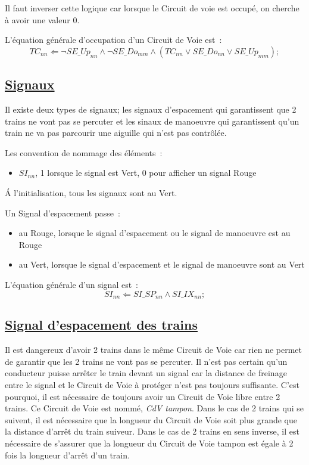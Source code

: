 Il faut inverser cette logique car lorsque le Circuit de voie est
occupé, on cherche à avoir une valeur 0.

\medskip
L'équation générale d'occupation d'un Circuit de Voie est~:
$$\boxed{
  TC_{nn} \Leftarrow \neg SE\_Up_{nn} \land \neg SE\_Do_{mm} \land
  (TC_{nn} \lor SE\_Do_{nn} \lor SE\_Up_{mm});
}$$


\subsection{\underline{Signaux}}
\label{sec:esp}

Il existe deux types de signaux; les signaux d'espacement qui
garantissent que 2 trains ne vont pas se percuter et les sinaux de
manoeuvre qui garantissent qu'un train ne va pas parcourir une
aiguille qui n'est pas contrôlée.

Les convention de nommage des éléments~:
\begin{itemize}
\item $SI_{nn}$, 1 lorsque le signal est Vert, 0 pour afficher un signal
  Rouge
\end{itemize}

\'A l'initialisation, tous les signaux sont au Vert.

Un Signal d'espacement passe~:
\begin{itemize}
\item au Rouge, lorsque le signal d'espacement ou le signal de
  manoeuvre est au Rouge
\item au Vert, lorsque le signal d'espacement et le signal de
  manoeuvre sont au Vert
\end{itemize}


\medskip
L'équation générale d'un signal est~:
$$\boxed{
  SI_{nn} \Leftarrow SI\_SP_{nn} \land SI\_IX_{nn};
}$$


\subsection{\underline{Signal d'espacement des trains}}
\label{sec:esp}

Il est dangereux d'avoir 2 trains dans le même Circuit de Voie car
rien ne permet de garantir que les 2 trains ne vont pas se
percuter. Il n'est pas certain qu'un conducteur puisse arrêter le
train devant un signal car la distance de freinage entre le signal et
le Circuit de Voie à protéger n'est pas toujours suffisante. C'est
pourquoi, il est nécessaire de toujours avoir un Circuit de Voie libre
entre 2 trains. Ce Circuit de Voie est nommé, \emph{CdV tampon}.  Dans
le cas de 2 trains qui se suivent, il est nécessaire que la longueur
du Circuit de Voie soit plus grande que la distance d'arrêt du train
suiveur.  Dans le cas de 2 trains en sens inverse, il est nécessaire
de s'assurer que la longueur du Circuit de Voie tampon est égale à 2
fois la longueur d'arrêt d'un train.

